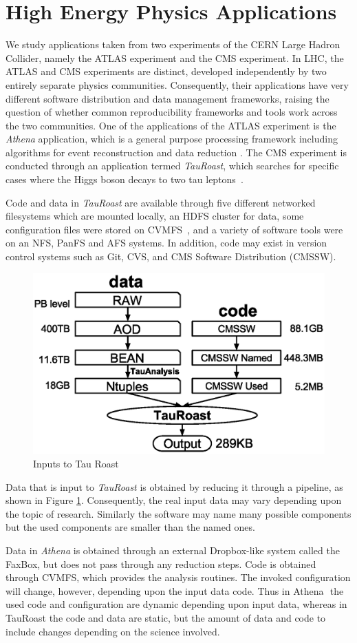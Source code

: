 \section{High Energy Physics Applications}

We study applications taken from two experiments of the CERN Large Hadron Collider, namely the ATLAS experiment and the CMS experiment. 
In LHC, the ATLAS and CMS experiments are distinct, 
developed independently by two entirely separate physics communities. Consequently, their applications  
have very different software distribution and data management frameworks, raising the question of whether common reproducibility frameworks and tools work across the two communities.  
One of the applications of the ATLAS experiment is the \emph{Athena} application, which is a general purpose processing framework including algorithms
for event reconstruction and data reduction \cite{calafiura2005athena}. The CMS experiment is conducted through an application termed  \emph{TauRoast}, which searches for specific 
cases where the Higgs boson decays to two tau leptons~\cite{chatrchyan2013search}. 

Code and data in \emph{TauRoast} are available through five different networked filesystems which are mounted locally, an HDFS cluster for data, 
some configuration files were stored on CVMFS~\cite{blomer2011cernvm}, and a variety of software tools were on an NFS, PanFS and AFS systems.
In addition, code may exist in version control systems such as Git, CVS, and CMS Software Distribution (CMSSW). %
\begin{figure}
\small
\centering
\includegraphics[width=.4\textwidth]{data-code-size.eps}
\caption{Inputs to Tau Roast}
\label{fig:data-code-size}
\end{figure}
Data that is input to \emph{TauRoast} is obtained by reducing it through a pipeline, as shown in Figure \ref{fig:data-code-size}. Consequently, the real input data may 
vary depending upon the topic of research. Similarly the software may name many possible components but the used components are
smaller than the named ones. 

Data in \emph{Athena} is obtained through an external Dropbox-like system called the FaxBox, but does not pass through any reduction steps. Code is obtained through 
CVMFS, which provides the analysis routines. 
The invoked configuration will change, however, depending upon the input data code.  Thus in Athena  the used code and configuration are dynamic depending upon input data, whereas in TauRoast the code and data are static, but the amount of data and code to include changes depending on the science involved.

